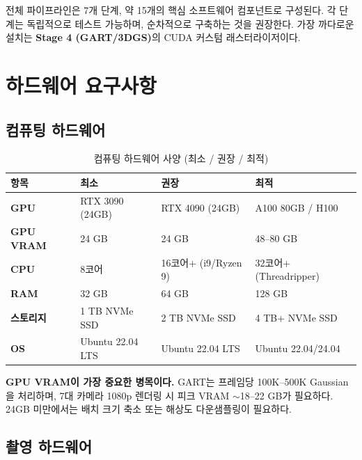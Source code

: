 \documentclass[11pt, a4paper]{report}
\begin{document}
\begin{keyidea}
전체 파이프라인은 7개 단계, 약 15개의 핵심 소프트웨어 컴포넌트로 구성된다.
각 단계는 독립적으로 테스트 가능하며, 순차적으로 구축하는 것을 권장한다.
가장 까다로운 설치는 \textbf{Stage 4 (GART/3DGS)}의 CUDA 커스텀 래스터라이저이다.
\end{keyidea}


\chapter{하드웨어 요구사항}
\label{ch:hardware}

\section{컴퓨팅 하드웨어}

\begin{table}[H]
\centering
\caption{컴퓨팅 하드웨어 사양 (최소 / 권장 / 최적)}
\label{tab:compute_hw}
\renewcommand{\arraystretch}{1.3}
\begin{tabularx}{\textwidth}{lXXX}
\toprule
\textbf{항목} & \textbf{최소} & \textbf{권장} & \textbf{최적} \\
\midrule
\textbf{GPU} & RTX 3090 (24GB) & RTX 4090 (24GB) & A100 80GB / H100 \\
\textbf{GPU VRAM} & 24 GB & 24 GB & 48--80 GB \\
\textbf{CPU} & 8코어 & 16코어+ (i9/Ryzen 9) & 32코어+ (Threadripper) \\
\textbf{RAM} & 32 GB & 64 GB & 128 GB \\
\textbf{스토리지} & 1 TB NVMe SSD & 2 TB NVMe SSD & 4 TB+ NVMe SSD \\
\textbf{OS} & Ubuntu 22.04 LTS & Ubuntu 22.04 LTS & Ubuntu 22.04/24.04 \\
\bottomrule
\end{tabularx}
\end{table}

\begin{warningbox}
\textbf{GPU VRAM이 가장 중요한 병목이다.}
GART는 프레임당 100K--500K Gaussian을 처리하며,
7대 카메라 1080p 렌더링 시 피크 VRAM $\sim$18--22 GB가 필요하다.
24GB 미만에서는 배치 크기 축소 또는 해상도 다운샘플링이 필요하다.
\end{warningbox}


\section{촬영 하드웨어}
\end{document}
